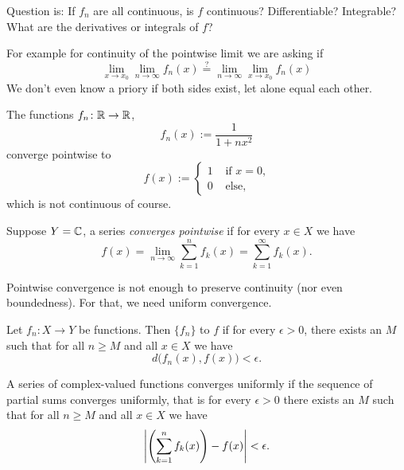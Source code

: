 Question is:
If $f_n$ are all continuous, is $f$ continuous?  Differentiable?
Integrable?  What are the derivatives or integrals of $f$?

For example for continuity of the pointwise limit we are asking if
\begin{equation*}
\lim_{x\to x_0} \lim_{n\to\infty} f_n(x)
\overset{?}{=}
\lim_{n\to\infty} \lim_{x\to x_0} f_n(x)
\end{equation*}
We don't even know a priory if both sides exist, let alone equal each other.

\begin{example}
The functions $f_n \colon {\mathbb{R}} \to {\mathbb{R}}$,
\begin{equation*}
f_n(x) := \frac{1}{1+nx^2}
\end{equation*}
converge pointwise to
\begin{equation*}
f(x) := 
\begin{cases}
1 & \text{ if $x=0$,} \\
0 & \text{ else,}
\end{cases}
\end{equation*}
which is not continuous of course.
\end{example}

Suppose $Y={\mathbb{C}}$, a series
\emph{converges pointwise} if
for every $x \in X$ we have
\begin{equation*}
f(x) = \lim_{n\to \infty} \sum_{k=1}^n f_k(x) =
\sum_{k=1}^\infty f_k(x) .
\end{equation*}

Pointwise convergence is not enough to preserve continuity (nor even
boundedness).  For that, we need uniform convergence.

Let $f_n \colon X \to Y$ be functions.  Then
$\{f_n\}$ \emph{}
to $f$ if
for every $\epsilon > 0$, there exists an $M$ such that
for all $n \geq M$ and all $x \in X$ we have
\begin{equation*}
d\bigl(f_n(x),f(x)\bigr) < \epsilon .
\end{equation*}

A series of complex-valued functions converges uniformly if the sequence of
partial sums converges uniformly, that is for every $\epsilon > 0$
there exists an $M$ such that
for all $n \geq M$ and all $x \in X$ we have
\begin{equation*}
\left\lvert {\left(\sum_{k=1}^n f_k(x)\right)-f(x)} \right\rvert < \epsilon .
\end{equation*}

